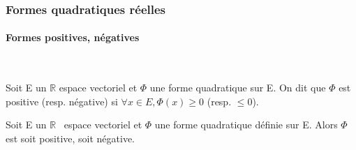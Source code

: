%
\subsubsection{Formes quadratiques réelles}
%
\paragraph{Formes positives, négatives}
\ 

\begin{de}
Soit E un $\mathbb{R}$ espace vectoriel et $\Phi$ une forme
quadratique sur E. On dit que $\Phi$ est positive (resp. négative) si
$\forall x \in E, \Phi(x) \geq 0$ (resp. $\leq 0$).
\end{de}
%
%
%
\begin{prop}
Soit E un $\mathbb{R}$~ espace vectoriel et $\Phi$ une forme
quadratique définie sur E. Alors $\Phi$ est soit positive, soit négative.
\end{prop}
%
%
%
